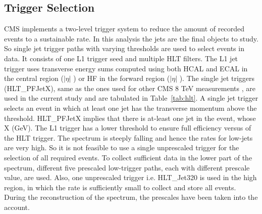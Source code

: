\subsection{Trigger Selection}

CMS implements a two-level trigger system to reduce the amount of recorded events to a sustainable rate. In this analysis the jets are the final objects to study. So single jet trigger paths with varying thresholds are used to select events in data. It consists of one L1 trigger seed and multiple HLT filters. The L1 jet trigger uses transverse energy sums computed using both HCAL and ECAL in the central region ($|\eta|$ ) or HF in the forward region ($|\eta|$ ). The single jet triggers (HLT\_PFJetX), same as the ones used for other CMS 8 TeV measurements \cite{Khachatryan:2016mlc,Sirunyan:2017skj}, are used in the current study and are tabulated in Table~\ref{tab:hlt}. A single jet trigger selects an event in which at least one jet has the transverse momentum above the threshold. HLT\_PFJetX implies that there is at-least one jet in the event, whose \pt \gr X (GeV). The L1 trigger has a lower threshold to ensure full efficiency versus \pt of the HLT trigger. The \pt spectrum is steeply falling and hence the rates for low-\pt jets are very high. So it is not feasible to use a single unprescaled trigger for the selection of all required events. To collect sufficient data in the lower part of the \pt spectrum, different five prescaled low-\pt trigger paths, each with different prescale value, are used. Also, one unprescaled trigger i.e. HLT\_Jet320 is used in the high \pt region, in which the rate is sufficiently small to collect and store all events. During the reconstruction of the spectrum, the prescales have been taken into the account.

